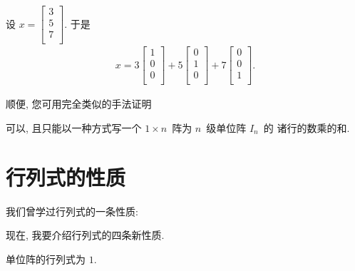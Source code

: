 \documentclass[%
    UTF8,%
    fontset=none,%
    punct=kaiming,%
    zihao=-4,%
    a4paper,%
    oneside,%
]{ctexbook}
\begin{document}
\begin{example}
    设
    \(
    x = \begin{bmatrix}
        3 \\ 5 \\ 7 \\
    \end{bmatrix}.
    \)
    于是
    \begin{align*}
        x =
        3\begin{bmatrix}
             1 \\ 0 \\ 0 \\
         \end{bmatrix}
        + 5\begin{bmatrix}
               0 \\ 1 \\ 0 \\
           \end{bmatrix}
        + 7\begin{bmatrix}
               0 \\ 0 \\ 1 \\
           \end{bmatrix}.
    \end{align*}
\end{example}

顺便, 您可用完全类似的手法证明

\begin{theorem}
    可以, 且只能以一种方式写一个
    \(1 \times n\)~阵为 \(n\)~级单位阵 \(I_n\)~的%
    诸行的数乘的和.
\end{theorem}

\section{行列式的性质}

我们曾学过行列式的一条性质:

\TheoremTranspose*

现在, 我要介绍行列式的四条新性质.

\begin{theorem}[规范性]
    单位阵的行列式为 \(1\).
\end{theorem}
\end{document}

